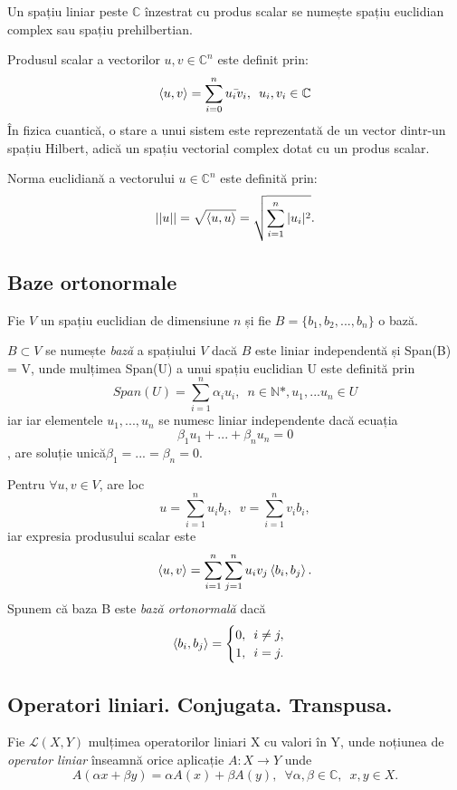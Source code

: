 Un spațiu liniar peste $\mathbb{C}$ înzestrat cu produs scalar se numește spațiu euclidian complex sau spațiu prehilbertian.

Produsul scalar a vectorilor $u, v \in \mathbb{C}^n$ este definit prin:
\[
    \braket{u,v} = \sum_{i=0}^{n} \bar{u_i v_i}, \enspace u_i, v_i \in \mathbb{C}
\]
În fizica cuantică, o stare a unui sistem este reprezentată de un vector dintr-un spațiu Hilbert, adică un spațiu vectorial complex dotat cu un produs scalar.

Norma euclidiană a vectorului $u \in \mathbb{C}^n$ este definită prin:
\[
||u|| = \sqrt{\braket{u,u}} = \sqrt{\sum_{i=1}^{n} |u_i|^2}.
\]

\subsection{Baze ortonormale}

Fie $V$ un spațiu euclidian de dimensiune $n$ și fie $B = \{b_1, b_2, ... , b_n\}$ o bază.

$B \subset V$ se numește \textit{bază} a spațiului $V$ dacă $B$ este liniar independentă și Span(B) = V, unde mulțimea Span(U) a unui spațiu euclidian U este definită prin  \[Span(U) =\sum_{i=1}^{n} \alpha_i u_i, \enspace n \in \mathbb{N}\text{*}, u_1, ... u_n \in U\] iar iar elementele $u_1, ..., u_n$ se numesc liniar independente dacă ecuația \[\beta_1 u_1 + ... + \beta_n u_n =0\], are soluție unică$\beta_1 = ... = \beta_n = 0$.


Pentru $\forall u, v \in V$, are loc 
\[
u = \sum_{i=1}^{n} u_i b_i, \enspace v = \sum_{i=1}^n v_i b_i,
\]
iar expresia produsului scalar este 
\[
\braket{u, v} = \sum_{i=1}^{n} \sum_{j=1}^{n} u_i v_j \braket{b_i, b_j}.
\]
Spunem că baza B este \textit{bază ortonormală} dacă
\[
\braket{b_i, b_j} =
\begin{cases}
0, \enspace i \neq j, \\
1, \enspace i = j.
\end{cases}
\]

\subsection{Operatori liniari. Conjugata. Transpusa.}

Fie $\mathcal{L}(X, Y)$ mulțimea operatorilor liniari X cu valori în Y, unde noțiunea de \textit{operator liniar} înseamnă orice aplicație $A: X \rightarrow Y$ unde 
\[
A (\alpha x + \beta y) = \alpha A(x) + \beta A(y), \enspace \forall \alpha, \beta \in \mathbb{C}, \enspace x, y \in X.
\]

